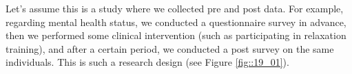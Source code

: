 \documentclass{ltjsbook}
\begin{document}
Let's assume this is a study where we collected pre and post data. For example, regarding mental health status, we conducted a questionnaire survey in advance, then we performed some clinical intervention (such as participating in relaxation training), and after a certain period, we conducted a post survey on the same individuals. This is such a research design (see Figure \ref{fig::19_01}).



\end{document}
